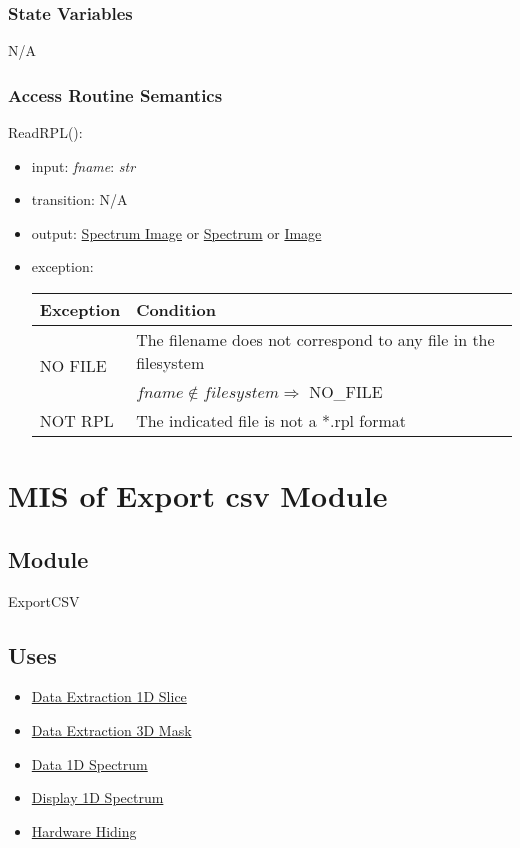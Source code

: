 \documentclass[12pt, titlepage]{article}
\begin{document}
\subsubsection{State Variables}
N/A

\subsubsection{Access Routine Semantics}

\noindent ReadRPL():
\begin{itemize}
    \item input: \textit{fname}: \textit{str}
    \item transition: N/A
    \item output: \hyperref[Mod:SI]{Spectrum Image} or
    \hyperref[Mod:Spectrum]{Spectrum} or \hyperref[Mod:Image]{Image}
    \item exception: 
    \begin{center}
        \begin{tabular}{p{3cm} p{12cm}}
            \toprule[0.15em]
            \textbf{Exception} & \textbf{Condition}\\
            \midrule[0.1em]
            \multirow{2}{0.25\textwidth}{NO FILE} & The filename does not
            correspond to any file in the filesystem\\ 
            & $fname \notin filesystem \Rightarrow$ NO\_FILE\\ 
            \midrule[0.05em]
            NOT RPL & The indicated file is not a *.rpl format\\
            \bottomrule[0.15em]
        \end{tabular}
    \end{center}
\end{itemize}

\section{MIS of Export csv Module} \label{Mod:ExportCSV}

\subsection{Module}

ExportCSV

\subsection{Uses}
\begin{itemize}
    \item \hyperref[Mod:Slice1D]{Data Extraction 1D Slice}
    \item \hyperref[Mod:Mask3D]{Data Extraction 3D Mask}
    \item \hyperref[Mod:Spectrum]{Data 1D Spectrum}
    \item \hyperref[Mod:Disp1D]{Display 1D Spectrum}
    \item \hyperref[Mod:HH]{Hardware Hiding}
\end{itemize}
\end{document}
